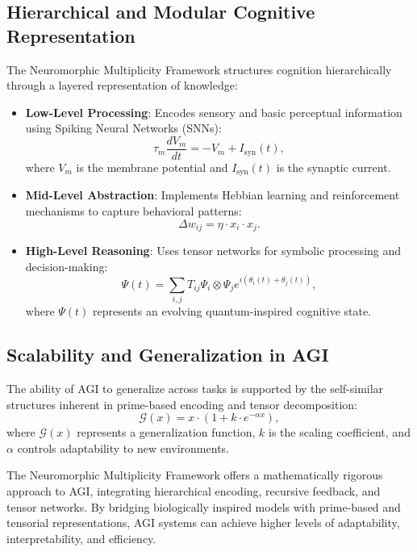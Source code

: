 \documentclass{article}
\theoremstyle{plain}
\begin{document}
\subsection{Hierarchical and Modular Cognitive Representation}
The Neuromorphic Multiplicity Framework structures cognition hierarchically through a layered representation of knowledge:
\begin{itemize}
    \item \textbf{Low-Level Processing}: Encodes sensory and basic perceptual information using Spiking Neural Networks (SNNs):
    \begin{equation}
        \tau_m \frac{dV_m}{dt} = - V_m + I_{\text{syn}}(t),
    \end{equation}
    where $V_m$ is the membrane potential and $I_{\text{syn}}(t)$ is the synaptic current.
    
    \item \textbf{Mid-Level Abstraction}: Implements Hebbian learning and reinforcement mechanisms to capture behavioral patterns:
    \begin{equation}
        \Delta w_{ij} = \eta \cdot x_i \cdot x_j.
    \end{equation}
    
    \item \textbf{High-Level Reasoning}: Uses tensor networks for symbolic processing and decision-making:
    \begin{equation}
        \Psi(t) = \sum_{i,j} T_{ij} \Psi_i \otimes \Psi_j e^{i(\theta_i(t) + \theta_j(t))},
    \end{equation}
    where $\Psi(t)$ represents an evolving quantum-inspired cognitive state.
\end{itemize}

\subsection{Scalability and Generalization in AGI}
The ability of AGI to generalize across tasks is supported by the self-similar structures inherent in prime-based encoding and tensor decomposition:
\begin{equation}
    \mathcal{G}(x) = x \cdot (1 + k \cdot e^{-\alpha x}),
\end{equation}
where $\mathcal{G}(x)$ represents a generalization function, $k$ is the scaling coefficient, and $\alpha$ controls adaptability to new environments.

The Neuromorphic Multiplicity Framework offers a mathematically rigorous approach to AGI, integrating hierarchical encoding, recursive feedback, and tensor networks. By bridging biologically inspired models with prime-based and tensorial representations, AGI systems can achieve higher levels of adaptability, interpretability, and efficiency.
\end{document}
